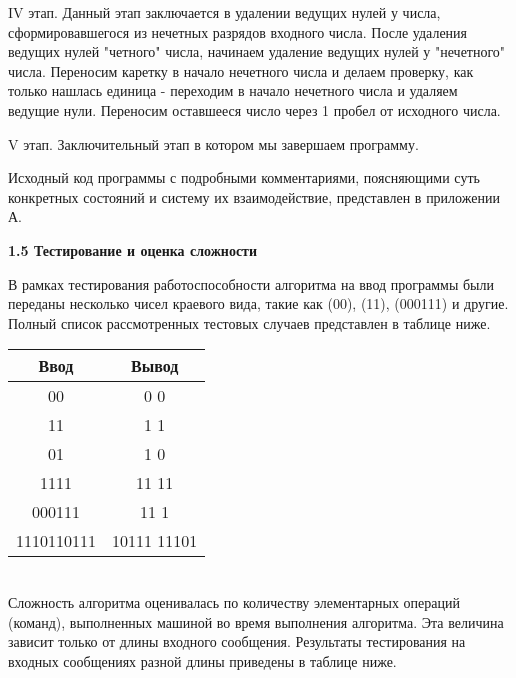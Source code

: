 \documentclass{article}
\begin{document}
\vspace{-0.2cm}
\par IV этап. Данный этап заключается в удалении ведущих нулей у числа, сформировавшегося из нечетных разрядов входного числа. После удаления ведущих нулей "четного" числа, начинаем удаление ведущих нулей у "нечетного" числа. Переносим каретку в начало нечетного числа и делаем проверку, как только нашлась единица - переходим в начало нечетного числа и удаляем ведущие нули. Переносим оставшееся число через 1 пробел от исходного числа. \\

\vspace{-0.2cm}
\par V этап. Заключительный этап в котором мы завершаем программу.\\

\par Исходный код программы с подробными комментариями, поясняющими суть конкретных состояний и систему их взаимодействие, представлен в приложении А.\\

\par\textbf{1.5 Тестирование и оценка сложности}\\
\par В рамках тестирования работоспособности алгоритма на ввод программы были переданы несколько чисел краевого вида, такие как (00), (11), (000111) и другие. Полный список рассмотренных тестовых случаев представлен в таблице ниже.

\begin{center}
\begin{tabular}{|c|c|}
    \hline
    Ввод & Вывод \\
    \hline
    00  & 0 0 \\
    \hline
    11 & 1 1\\
    \hline
    01 & 1 0 \\
    \hline
    1111 & 11 11 \\
    \hline
    000111 & 11 1 \\
    \hline
    1110110111 & 10111 11101 \\
    \hline
\end{tabular}
\end{center}

\\
Сложность алгоритма оценивалась по количеству элементарных операций (команд), выполненных машиной во время выполнения алгоритма. Эта величина зависит только от длины входного сообщения. Результаты тестирования на входных 
сообщениях разной длины приведены в таблице ниже.
\end{document}
